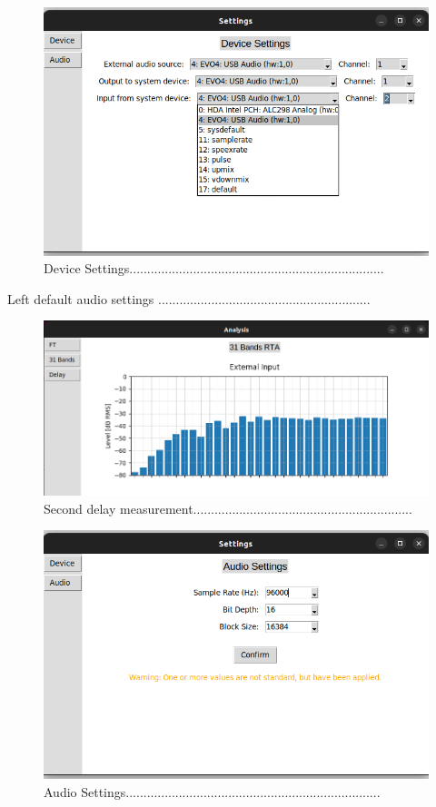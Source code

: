 \begin{figure}[H]
	\centering
	\includegraphics[width=0.6
	\linewidth]{Figures/Coro_Device_settings.png}
	\caption{Device Settings........................................................................}
	\label{fig:Coro_device_settings}
\end{figure}

Left default audio settings ............................................................

\begin{figure}[H]
	\centering
	\includegraphics[width=0.6
	\linewidth]{Figures/Coro_Pink_Bad.png}
	\caption{Second delay measurement..............................................................}
	\label{fig:Coro_Bad_Pink}
\end{figure}

\begin{figure}[H]
	\centering
	\includegraphics[width=0.6
	\linewidth]{Figures/Coro_audio_settings.png}
	\caption{Audio Settings........................................................................}
	\label{fig:Coro_audio_settings}
\end{figure}

